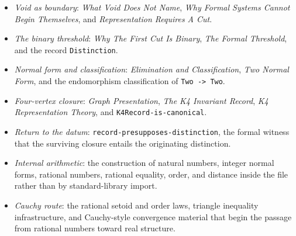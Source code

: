 \documentclass[11pt]{article}
\begin{document}
\begin{itemize}
\item \emph{Void as boundary}: \emph{What Void Does Not Name},
  \emph{Why Formal Systems Cannot Begin Themselves}, and
  \emph{Representation Requires A Cut}.
\item \emph{The binary threshold}: \emph{Why The First Cut Is Binary},
  \emph{The Formal Threshold}, and the record \texttt{Distinction}.
\item \emph{Normal form and classification}: \emph{Elimination and
  Classification}, \emph{Two Normal Form}, and the endomorphism
  classification of \texttt{Two -> Two}.
\item \emph{Four-vertex closure}: \emph{Graph Presentation},
  \emph{The K4 Invariant Record}, \emph{K4 Representation Theory},
  and \texttt{K4Record-is-canonical}.
\item \emph{Return to the datum}: \texttt{record-presupposes-distinction},
  the formal witness that the surviving closure entails the originating
  distinction.
\item \emph{Internal arithmetic}: the construction of natural numbers,
  integer normal forms, rational numbers, rational equality, order, and
  distance inside the file rather than by standard-library import.
\item \emph{Cauchy route}: the rational setoid and order laws, triangle
  inequality infrastructure, and Cauchy-style convergence material that
  begin the passage from rational numbers toward real structure.
\end{itemize}
\end{document}
